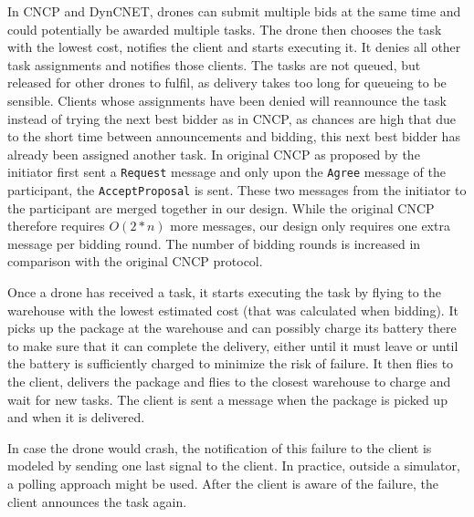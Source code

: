 \documentclass[10pt,a4paper]{article}
\newcommand{\commentY}[1]{\todo[inline, color=yellow]{Yens: #1}}
\begin{document}
In CNCP and DynCNET, drones can submit multiple bids at the same time and could potentially be awarded multiple tasks. The drone then chooses the task with the lowest cost, notifies the client and starts executing it. It denies all other task assignments and notifies those clients. The tasks are not queued, but released for other drones to fulfil, as delivery takes too long for queueing to be sensible. Clients whose assignments have been denied will reannounce the task instead of trying the next best bidder as in CNCP, as chances are high that due to the short time between announcements and bidding, this next best bidder has already been assigned another task. In original CNCP as proposed by \cite{CNCP} the initiator first sent a \texttt{Request} message and only upon the \texttt{Agree} message of the participant, the \texttt{AcceptProposal} is sent. These two messages from the initiator to the participant are merged together in our design. While the original CNCP therefore requires $O(2*n)$ more messages, our design only requires one extra message per bidding round. The number of bidding rounds is increased in comparison with the original CNCP protocol.
\commentY{Hierboven nog wat veel aangepast}


Once a drone has received a task, it starts executing the task by flying to the warehouse with the lowest estimated cost (that was calculated when bidding). It picks up the package at the warehouse and can possibly charge its battery there to make sure that it can complete the delivery, either until it must leave or until the battery is sufficiently charged to minimize the risk of failure. It then flies to the client, delivers the package and flies to the closest warehouse to charge and wait for new tasks. The client is sent a message when the package is picked up and when it is delivered.

In case the drone would crash, the notification of this failure to the client is modeled by sending one last signal to the client. In practice, outside a simulator, a polling approach might be used. After the client is aware of the failure, the client announces the task again.
\end{document}
